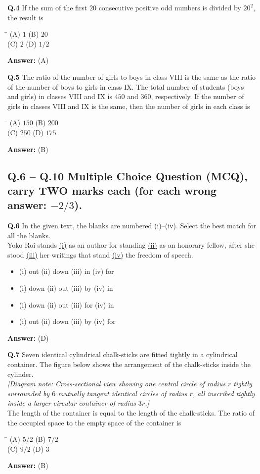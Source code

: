 \documentclass[11pt,a4paper]{article}
\newcommand{\optsfourA}[4]{%
  \begin{tabbing}
    \hspace{0.48\linewidth}\=\kill
    (A) #1 \> (B) #2 \\[2pt]
    (C) #3 \> (D) #4
  \end{tabbing}%
}
\newcommand{\optslistA}[4]{%
  \begin{itemize}
    \setlength{\itemsep}{2pt}\setlength{\parskip}{0pt}
    \item[(A)] #1
    \item[(B)] #2
    \item[(C)] #3
    \item[(D)] #4
  \end{itemize}%
}
\newcommand{\ans}[1]{\textbf{Answer:} #1\par\medskip}
\begin{document}
\textbf{Q.4} If the sum of the first $20$ consecutive positive odd numbers is divided by $20^2$, the result is
\optsfourA{$1$}{$20$}{$2$}{$1/2$}
\ans{(A)}

\textbf{Q.5} The ratio of the number of girls to boys in class VIII is the same as the ratio of the number of boys to girls in class IX. The total number of students (boys and girls) in classes VIII and IX is $450$ and $360$, respectively. If the number of girls in classes VIII and IX is the same, then the number of girls in each class is
\optsfourA{$150$}{$200$}{$250$}{$175$}
\ans{(B)}

\subsection*{Q.6 -- Q.10 Multiple Choice Question (MCQ), carry TWO marks each (for each wrong answer: $-2/3$).}

\textbf{Q.6} In the given text, the blanks are numbered (i)--(iv). Select the best match for all the blanks.\\
Yoko Roi stands \underline{\hspace{0.7cm}(i)\hspace{0.7cm}} as an author for standing \underline{\hspace{0.7cm}(ii)\hspace{0.7cm}} as an honorary fellow, after she stood \underline{\hspace{0.7cm}(iii)\hspace{0.7cm}} her writings that stand \underline{\hspace{0.7cm}(iv)\hspace{0.7cm}} the freedom of speech.
\optslistA{(i) out \quad (ii) down \quad (iii) in \quad (iv) for}{(i) down \quad (ii) out \quad (iii) by \quad (iv) in}{(i) down \quad (ii) out \quad (iii) for \quad (iv) in}{(i) out \quad (ii) down \quad (iii) by \quad (iv) for}
\ans{(D)}

\textbf{Q.7} Seven identical cylindrical chalk-sticks are fitted tightly in a cylindrical container. The figure below shows the arrangement of the chalk-sticks inside the cylinder.\\
\emph{[Diagram note: Cross-sectional view showing one central circle of radius $r$ tightly surrounded by $6$ mutually tangent identical circles of radius $r$, all inscribed tightly inside a larger circular container of radius $3r$.]}\\
The length of the container is equal to the length of the chalk-sticks. The ratio of the occupied space to the empty space of the container is
\optsfourA{$5/2$}{$7/2$}{$9/2$}{$3$}
\ans{(B)}
\end{document}
